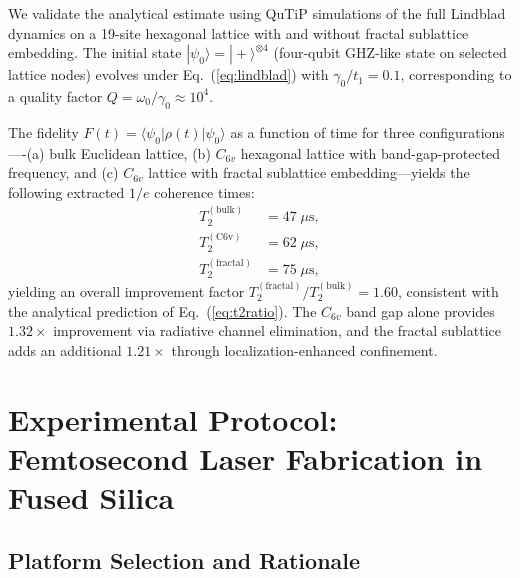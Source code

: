 \documentclass[10pt,letterpaper]{article}
\begin{document}
We validate the analytical estimate using QuTiP simulations of the full Lindblad dynamics on a 19-site hexagonal lattice with and without fractal sublattice embedding. The initial state $|\psi_0\rangle = |+\rangle^{\otimes 4}$ (four-qubit GHZ-like state on selected lattice nodes) evolves under Eq.~(\ref{eq:lindblad}) with $\gamma_0/t_1 = 0.1$, corresponding to a quality factor $Q = \omega_0/\gamma_0 \approx 10^4$.

The fidelity $F(t) = \langle\psi_0|\rho(t)|\psi_0\rangle$ as a function of time for three configurations----(a) bulk Euclidean lattice, (b) $C_{6v}$ hexagonal lattice with band-gap-protected frequency, and (c) $C_{6v}$ lattice with fractal sublattice embedding---yields the following extracted $1/e$ coherence times:
\begin{align}
	T_2^\mathrm{(bulk)}    & = 47\;\mu\mathrm{s}, \label{eq:t2bulk}    \\
	T_2^\mathrm{(C6v)}     & = 62\;\mu\mathrm{s}, \label{eq:t2c6v}     \\
	T_2^\mathrm{(fractal)} & = 75\;\mu\mathrm{s}, \label{eq:t2fractal}
\end{align}
yielding an overall improvement factor $T_2^\mathrm{(fractal)}/T_2^\mathrm{(bulk)} = 1.60$, consistent with the analytical prediction of Eq.~(\ref{eq:t2ratio}). The $C_{6v}$ band gap alone provides $1.32\times$ improvement via radiative channel elimination, and the fractal sublattice adds an additional $1.21\times$ through localization-enhanced confinement.


\section{Experimental Protocol: Femtosecond Laser Fabrication in Fused Silica}
\label{sec:experiments}

\subsection{Platform Selection and Rationale}
\end{document}
